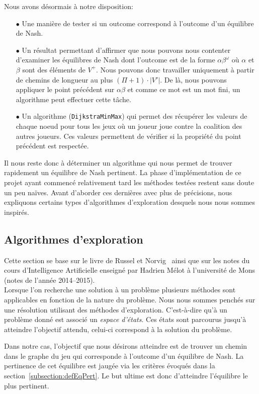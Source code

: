 Nous avons désormais à notre disposition:
\begin{itemize}
	\item[$\bullet$] Une manière de tester si un outcome correspond à l'outcome d'un équilibre de Nash.
	\item[$\bullet$] Un résultat permettant d'affirmer que nous pouvons nous contenter d'examiner les équilibres de Nash dont l'outcome est de la forme $\alpha \beta^{\omega}$ où $\alpha$ et $\beta$ sont des éléments de $V^{+}$. Nous pouvons donc travailler uniquement à partir de chemins de longueur au plus $(\Pi + 1)\cdot |V'|$. De là, nous pouvons appliquer le point précédent sur $\alpha\beta$ et comme ce mot est un mot fini, un algorithme peut effectuer cette tâche. 
	\item[$\bullet$] Un algorithme (\verb|DijkstraMinMax|) qui permet des récupérer les valeurs de chaque noeud pour tous les jeux  où un joueur joue contre la coalition des autres joueurs. Ces valeurs permettent de vérifier si la propriété du point précédent est respectée.
\end{itemize}
\smallskip
\indent Il nous reste donc à déterminer un algorithme qui nous permet de trouver rapidement un équilibre de Nash pertinent. La phase d'implémentation de ce projet ayant commencé relativement tard les méthodes testées restent sans doute un peu naïves. Avant d'aborder ces dernières avec plus de précisions, nous expliquons certains types d'algorithmes d'exploration desquels nous nous sommes inspirés.

\subsection{Algorithmes d'exploration}

Cette section se base sur le livre de Russel et Norvig~\cite{artInt} ainsi que sur les notes du cours d'Intelligence Artificielle enseigné par Hadrien Mélot à l'université de Mons (notes de l'année 2014--2015).\\


Lorsque l'on recherche une solution à un problème plusieurs méthodes sont applicables en fonction de la nature du problème. Nous nous sommes penchés sur une résolution utilisant des méthodes d'exploration. C'est-à-dire qu'à un problème donné est associé un \emph{espace d'états}. Ces états sont parcourus jusqu'à atteindre l'objectif attendu, celui-ci correspond à la solution du problème.

Dans notre cas, l'objectif que nous désirons atteindre est de trouver un chemin dans le graphe du jeu qui corresponde à l'outcome d'un équilibre de Nash. La pertinence de cet équilibre est jaugée via les critères évoqués dans la section~\ref{subsection:defEqPert}. Le but ultime est donc d'atteindre l'équilibre le plus pertinent.

